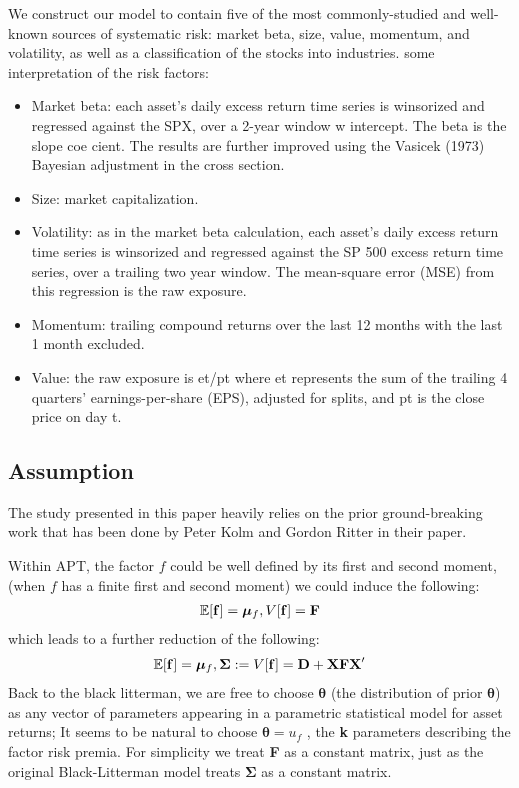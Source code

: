 \documentclass[12pt]{article}
\numberwithin{equation}{section}
\newcommand{\E}{\mathbb{E}}
\begin{document}
We construct our model to contain five of the most commonly-studied and well-known sources of systematic risk: market beta, size, value, momentum, and volatility, as well as a classification of the stocks into industries.
some interpretation of the risk factors:

\begin{itemize}
  \item Market beta: each asset's daily excess return time series is winsorized and regressed against the SPX, over a 2-year window w   intercept. The beta is the slope coe cient. The results are further improved using the Vasicek (1973) Bayesian adjustment in the cross section.
  \item Size: market capitalization.
  \item Volatility: as in the market beta calculation, each asset's daily excess return time series is winsorized and regressed against          the SP 500 excess return time series, over a trailing two year window. The mean-square error (MSE) from this regression is the           raw exposure.
  \item Momentum: trailing compound returns over the last 12 months with the last 1 month excluded. 
  \item Value: the raw exposure is et/pt where et represents the sum of the trailing 4 quarters' earnings-per-share (EPS), adjusted for          splits, and pt is the close price on day t.
\end{itemize}

\subsection{Assumption}
The study presented in this paper heavily relies on the prior ground-breaking work that has been done by Peter Kolm and Gordon Ritter in their paper.

Within APT, the factor $f$ could be well defined by its first and second moment,
(when $f$ has a finite first and second moment) we could induce the following:
\begin{align} 
\E[{\bf f}] =  \boldsymbol{\mu}_f, V[{\bf f}] = \textbf{F}
\end{align}
which leads to a further reduction of the following:
\begin{align} 
\E[{\bf f}] =  \boldsymbol{\mu}_f,  \boldsymbol{\Sigma} := V[{\bf f}] = \textbf{D} + \textbf{X} \textbf{F} \textbf{X} '
\end{align}
Back to the black litterman, we are free to choose $\boldsymbol{\theta}$ (the distribution of prior $\boldsymbol{\theta}$) as any vector of parameters appearing in a parametric statistical model for asset returns; It seems to be natural to choose $\boldsymbol{\theta}= u_f$ , the \textbf{k} parameters describing the factor risk premia. For simplicity we treat \textbf{F} as a constant matrix, just as the original Black-Litterman model treats $\boldsymbol{\Sigma}$ as a constant matrix.
\end{document}
